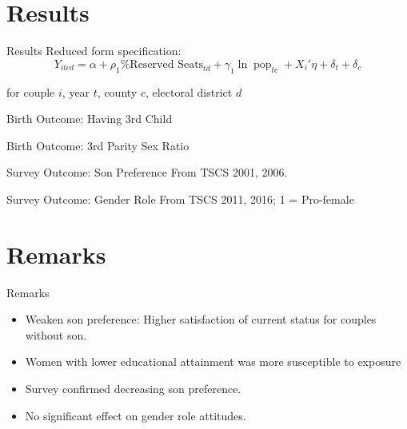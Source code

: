 \documentclass[
  10pt,
  ignorenonframetext,
  aspectratio=43,
]{beamer}
\providecommand{\tightlist}{%
  \setlength{\itemsep}{0pt}\setlength{\parskip}{0pt}}
\begin{document}
\begin{frame}

\end{frame}

\hypertarget{results}{%
\section{Results}\label{results}}

\begin{frame}{Results}
Reduced form specification: \[
Y_{itcd} = \alpha + \rho_1 \text{\% Reserved Seats}_{td}  + \gamma_1 \ln \operatorname{pop}_{tc} + X_i' \eta + \delta_t + \delta_{c}
\]

for couple \(i\), year \(t\), county \(c\), electoral district \(d\)
\end{frame}

\begin{frame}{Birth Outcome: Having 3rd Child}
\protect\hypertarget{birth-outcome-having-3rd-child}{}

\end{frame}

\begin{frame}{Birth Outcome: 3rd Parity Sex Ratio}
\protect\hypertarget{birth-outcome-3rd-parity-sex-ratio}{}

\end{frame}

\begin{frame}{Survey Outcome: Son Preference}
\protect\hypertarget{survey-outcome-son-preference}{}
From TSCS 2001, 2006.


\end{frame}

\begin{frame}{Survey Outcome: Gender Role}
\protect\hypertarget{survey-outcome-gender-role}{}
From TSCS 2011, 2016; 1 = Pro-female


\end{frame}

\hypertarget{remarks}{%
\section{Remarks}\label{remarks}}

\begin{frame}{Remarks}
\begin{itemize}
\tightlist
\item
  Weaken son preference: Higher satisfaction of current status for
  couples without son.
\item
  Women with lower educational attainment was more susceptible to
  exposure
\item
  Survey confirmed decreasing son preference.
\item
  No significant effect on gender role attitudes.
\end{itemize}
\end{frame}
\end{document}
